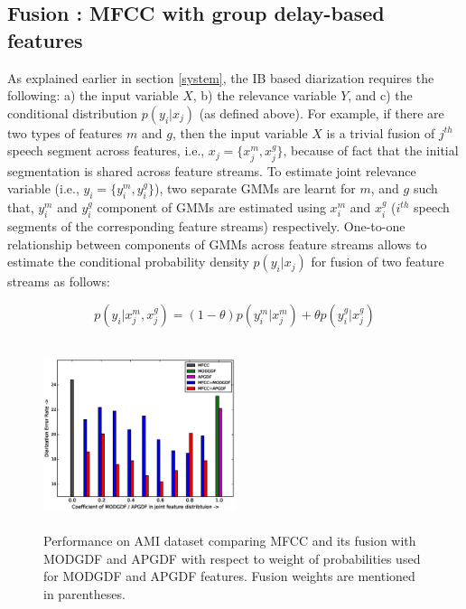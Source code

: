 \documentclass[conference]{IEEEtran}
\begin{document}
\subsection{Fusion : MFCC with group delay-based features}
\label{feature_fusion}

As explained earlier in section \ref{system}, the IB based diarization requires
the following: a) the input variable $X$, b) the relevance variable $Y$, and c)
the conditional distribution $p(y_i|x_j)$ (as defined above). For example, if
there are two types of features $m$ and $g$, then the input variable $X$ is a
trivial fusion of $j^{th}$ speech segment across features,
i.e., $x_j = \{x^{m}_j,x^{g}_j\}$, because of fact that the initial segmentation is shared across
feature streams. To estimate joint relevance variable (i.e., $y_i = \{
y_i^{m},y_i^{g}\}$), two separate GMMs are learnt for $m$, and $g$ such
that, $y_i^{m}$ and $y_i^{g}$ component of GMMs are estimated using
$x^{m}_i$ and $x^{g}_i$ ($i^{th}$ speech segments of the corresponding
feature streams) respectively. One-to-one relationship between
components of GMMs across feature streams allows to estimate the
conditional probability density $p(y_i|x_j)$ for fusion of two feature
streams as follows:

\begin{equation}
p(y_i|x^{m}_j,x^{g}_j) =  (1-\theta)  p(y_i^{m}|x^{m}_j) +  \theta  p(y_i^{g}|x^{g}_j)
\label{eq:feat_combs}
\end{equation}

\begin{figure}[h]
\centering
\includegraphics[width=0.5\textwidth,height=5.5cm]{figures/newFusionResults.eps}
\caption{Performance on AMI dataset comparing MFCC and its fusion with MODGDF
and APGDF with respect to weight of probabilities used for MODGDF and APGDF
features. Fusion weights are mentioned in parentheses.}
\label{fig:fusionResults}
\end{figure}
\end{document}
